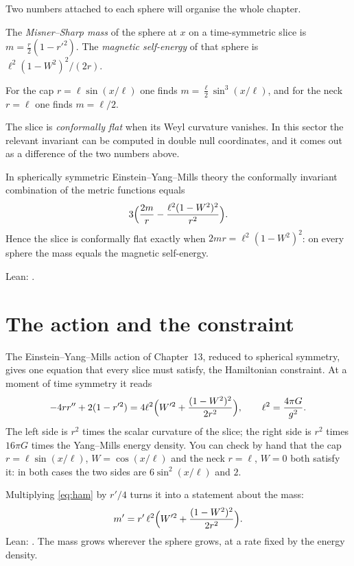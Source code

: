 Two numbers attached to each sphere will organise the whole chapter.

\begin{definition}
The \emph{Misner--Sharp mass} of the sphere at $x$ on a time-symmetric slice is $m=\tfrac r2(1-r'^2)$.
The \emph{magnetic self-energy} of that sphere is $\ell^2(1-W^2)^2/(2r)$.
\end{definition}

For the cap $r=\ell\sin(x/\ell)$ one finds $m=\tfrac\ell2\sin^3(x/\ell)$, and for the neck $r=\ell$ one finds $m=\ell/2$.

The slice is \emph{conformally flat} when its Weyl curvature vanishes. In this sector the relevant invariant can be computed in double null coordinates, and it comes out as a difference of the two numbers above.

\begin{proposition}[Weyl curvature = mass $-$ self-energy]\proved\label{prop:weyl}
In spherically symmetric Einstein--Yang--Mills theory the conformally invariant combination of the metric functions equals
\[
3\Bigl(\frac{2m}{r}-\frac{\ell^2(1-W^2)^2}{r^2}\Bigr).
\]
Hence the slice is conformally flat exactly when $2mr=\ell^2(1-W^2)^2$: on every sphere the mass equals the magnetic self-energy.
\end{proposition}
\noindent Lean: .

\section{The action and the constraint}

The Einstein--Yang--Mills action of Chapter~13, reduced to spherical symmetry, gives one equation that every slice must satisfy, the Hamiltonian constraint. At a moment of time symmetry it reads
\begin{equation}\label{eq:ham}
-4rr''+2(1-r'^2)=4\ell^2\Bigl(W'^2+\frac{(1-W^2)^2}{2r^2}\Bigr),\qquad \ell^2=\frac{4\pi G}{g^2}.
\end{equation}
The left side is $r^2$ times the scalar curvature of the slice; the right side is $r^2$ times $16\pi G$ times the Yang--Mills energy density. You can check by hand that the cap $r=\ell\sin(x/\ell)$, $W=\cos(x/\ell)$ and the neck $r=\ell$, $W=0$ both satisfy it: in both cases the two sides are $6\sin^2(x/\ell)$ and $2$.

Multiplying \eqref{eq:ham} by $r'/4$ turns it into a statement about the mass:
\begin{equation}\label{eq:massprime}
m'=r'\,\ell^2\Bigl(W'^2+\frac{(1-W^2)^2}{2r^2}\Bigr).
\end{equation}
\noindent Lean: . The mass grows wherever the sphere grows, at a rate fixed by the energy density.

